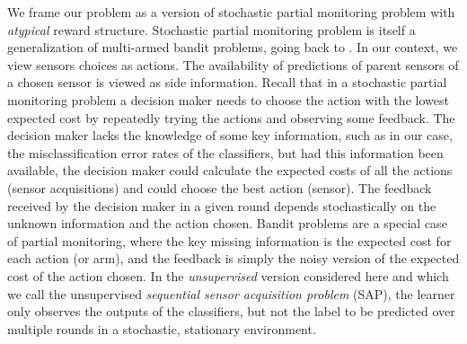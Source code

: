 

We frame our problem as a version of stochastic partial monitoring problem \citep{BaFoPaRaSze14} with \emph{atypical} reward structure. Stochastic partial monitoring problem is itself a generalization of multi-armed bandit problems, going back to \citet{Tho33}. In our context, we view sensors choices as actions. The availability of predictions of parent sensors of a chosen sensor is viewed as side information.  Recall that in a stochastic partial monitoring problem a decision maker needs to choose the action with the lowest expected cost by repeatedly trying the actions and observing some feedback.
The decision maker lacks the knowledge of some key information, such as in our case, the misclassification
error rates of the classifiers, but had this information been available, the decision maker could calculate the
expected costs of all the actions (sensor acquisitions) and could choose the best action (sensor). The feedback received by the decision maker in a given round depends stochastically on the unknown information and the action chosen.
Bandit problems are a special case of partial monitoring, where the key missing information is the expected
cost for each action (or arm), and the feedback is simply the noisy version of the expected cost of the action chosen.
In the \emph{unsupervised} version considered here
and which we call the unsupervised \emph{sequential sensor acquisition problem} (SAP),
the learner only observes the outputs of the classifiers, but not the label to be predicted over multiple rounds
in a stochastic, stationary environment. 




